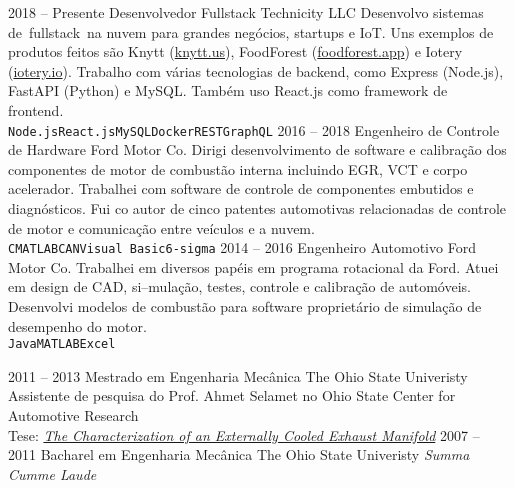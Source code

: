 \documentclass[9pt]{developercv} %
\begin{document}
\begin{entrylist}
	\entry
		{2018 -- Presente}
		{Desenvolvedor Fullstack}
		{Technicity LLC}
		{Desenvolvo sistemas de fullstack na nuvem para grandes negócios, 
		startups e IoT. Uns exemplos de produtos feitos são Knytt (\href{https://knytt.us}{knytt.us}), 
		FoodForest (\href{https://foodforest.app}{foodforest.app}) e Iotery (\href{https://iotery.io}{iotery.io}). 
		Trabalho com várias tecnologias de backend, como 
		Express (Node.js), FastAPI (Python) e MySQL. Também uso React.js como framework de frontend. \\
		\texttt{Node.js}\slashsep\texttt{React.js}\slashsep\texttt{MySQL}\slashsep\texttt{Docker}\slashsep\texttt{REST}\slashsep\texttt{GraphQL}}
	\entry
		{2016 -- 2018}
		{Engenheiro de Controle de Hardware}
		{Ford Motor Co.}
		{Dirigi desenvolvimento de software e calibração dos componentes 
		de motor de combustão interna incluindo EGR, VCT e corpo acelerador. 
		Trabalhei com software de controle de componentes embutidos e diagnósticos. 
		Fui co autor de cinco patentes automotivas relacionadas de controle de motor 
		e comunicação entre veículos e a nuvem. \\
		\texttt{C}\slashsep\texttt{MATLAB}\slashsep\texttt{CAN}\slashsep\texttt{Visual Basic}\slashsep\texttt{6-sigma}}
	\entry
		{2014 -- 2016}
		{Engenheiro Automotivo}
		{Ford Motor Co.}
		{Trabalhei em diversos papéis em programa rotacional da Ford. 
		Atuei em design de CAD, si--mulação, testes, controle e 
		calibração de automóveis. Desenvolvi modelos de combustão para 
		software proprietário de simulação de desempenho do motor. \\
		\texttt{Java}\slashsep\texttt{MATLAB}\slashsep\texttt{Excel}}
\end{entrylist}



\begin{entrylist}
	\entry
		{2011 -- 2013}
		{Mestrado em Engenharia Mecânica}
		{The Ohio State Univeristy}
		{Assistente de pesquisa do Prof. Ahmet Selamet no Ohio State Center for Automotive Research \\ 
		Tese: 
		\it{\href{https://etd.ohiolink.edu/!etd.send_file?accession=osu1385982535&disposition=inline}{The Characterization of an Externally Cooled Exhaust Manifold}}}
	\entry
		{2007 -- 2011}
		{Bacharel em Engenharia Mecânica}
		{The Ohio State Univeristy}
		{\it{Summa Cumme Laude}}
\end{entrylist}
\end{document}
